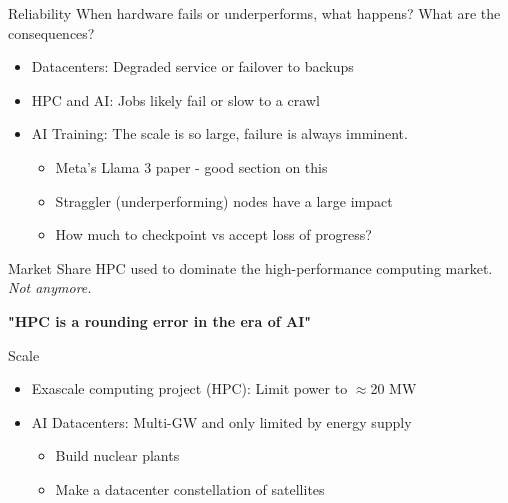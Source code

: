 \documentclass[aspectratio=169]{beamer}
\begin{document}
\begin{frame}{Reliability}
    When hardware fails or underperforms, what happens? What are the consequences?
    \begin{itemize}
        \item Datacenters: Degraded service or failover to backups
        \item HPC and AI: Jobs likely fail or slow to a crawl
        \item AI Training: The scale is so large, failure is always imminent.
        \begin{itemize}
            \item Meta's Llama 3 paper - good section on this
            \item Straggler (underperforming) nodes have a large impact
            \item How much to checkpoint vs accept loss of progress?
        \end{itemize}
    \end{itemize}
\end{frame}

\begin{frame}{Market Share}
    HPC used to dominate the high-performance computing market.\\
    \textit{Not anymore.}\\

    \begin{center}
        \textbf{\Large "HPC is a rounding error in the era of AI"}
    \end{center}
\end{frame}

\begin{frame}{Scale}
    \begin{itemize}
        \item Exascale computing project (HPC): Limit power to $\approx$20 MW
        \item AI Datacenters: Multi-GW and only limited by energy supply
        \begin{itemize}
            \item Build nuclear plants
            \item Make a datacenter constellation of satellites
        \end{itemize}
    \end{itemize}
\end{frame}
\end{document}
